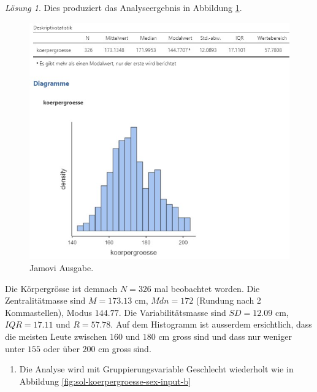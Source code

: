 \documentclass[
]{book}
\providecommand{\tightlist}{%
  \setlength{\itemsep}{0pt}\setlength{\parskip}{0pt}}
\theoremstyle{definition}
\theoremstyle{definition}
\theoremstyle{definition}
\theoremstyle{definition}
\theoremstyle{remark}
\newtheorem*{solution}{Lösung}
\begin{document}
\begin{solution}
Dies produziert das Analyseergebnis in Abbildung \ref{fig:sol-koerpergroesse-sex-output-a}.

\begin{figure}

{\centering \includegraphics[width=1\linewidth]{figures/02-exr-koerpergroesse-sex-jmv-output-a} 

}

\caption{Jamovi Ausgabe.}\label{fig:sol-koerpergroesse-sex-output-a}
\end{figure}

Die Körpergrösse ist demnach \(N=326\) mal beobachtet worden. Die Zentralitätmasse sind \(M=173.13\) cm, \(Mdn=172\) (Rundung nach 2 Kommastellen), Modus \(144.77\). Die Variabilitätsmasse sind \(SD=12.09\) cm, \(IQR=17.11\) und \(R=57.78\). Auf dem Histogramm ist ausserdem ersichtlich, dass die meisten Leute zwischen \(160\) und \(180\) cm gross sind und dass nur weniger unter \(155\) oder über \(200\) cm gross sind.

\begin{enumerate}
\def\labelenumi{(\alph{enumi})}
\setcounter{enumi}{1}
\tightlist
\item
  Die Analyse wird mit Gruppierungsvariable Geschlecht wiederholt wie in Abbildung \ref{fig:sol-koerpergroesse-sex-input-b}
\end{enumerate}

\begin{figure}


\end{figure}
\end{solution}
\end{document}
